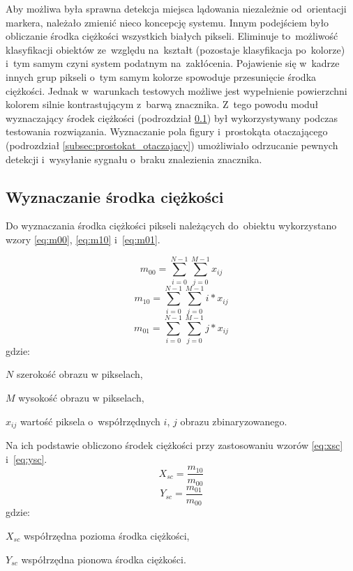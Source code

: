 Aby możliwa była sprawna detekcja miejsca lądowania niezależnie od~orientacji markera, należało zmienić nieco koncepcję systemu. 
Innym podejściem było obliczanie środka ciężkości wszystkich białych pikseli. 
Eliminuje to~możliwość klasyfikacji obiektów ze~względu na~kształt (pozostaje klasyfikacja po~kolorze) i~tym samym czyni system podatnym na~zakłócenia. 
Pojawienie się w~kadrze innych grup pikseli o~tym samym kolorze spowoduje przesunięcie środka ciężkości.
Jednak w~warunkach testowych możliwe jest wypełnienie powierzchni kolorem silnie kontrastującym z~barwą znacznika. 
Z~tego powodu moduł wyznaczający środek ciężkości (podrozdział \ref{subsec:srodek_ciezosci}) był wykorzystywany podczas testowania rozwiązania.
Wyznaczanie pola figury i~prostokąta otaczającego (podrozdział \ref{subsec:prostokat_otaczajacy}) umożliwiało odrzucanie pewnych detekcji i~wysyłanie sygnału o~braku znalezienia znacznika. 

\subsection{Wyznaczanie środka ciężkości}
\label{subsec:srodek_ciezosci}

Do wyznaczania środka ciężkości pikseli należących do~obiektu wykorzystano wzory \eqref{eq:m00}, \eqref{eq:m10} i~\eqref{eq:m01}.

\begin{equation}
\label{eq:m00}
m_{00}=\sum_{i=0}^{N-1}\sum_{j=0}^{M-1} x_{ij}
\end{equation}
\begin{equation}
\label{eq:m10}
m_{10}=\sum_{i=0}^{N-1}\sum_{j=0}^{M-1} i*x_{ij}
\end{equation}
\begin{equation}
\label{eq:m01}
m_{01}=\sum_{i=0}^{N-1}\sum_{j=0}^{M-1} j*x_{ij}
\end{equation}
gdzie:
\begin{eqwhere}[2cm]
	\item[$N$] szerokość obrazu w pikselach,
	\item[$M$] wysokość obrazu w pikselach,
	\item[$x_{ij}$] wartość piksela o~współrzędnych $i$, $j$ obrazu zbinaryzowanego.
\end{eqwhere}
Na ich podstawie obliczono środek ciężkości przy zastosowaniu wzorów \eqref{eq:xsc} i~\eqref{eq:ysc}.
\begin{equation}
\label{eq:xsc}
X_{sc}=\frac{m_{10}}{m_{00}}
\end{equation}
\begin{equation}
\label{eq:ysc}
Y_{sc}=\frac{m_{01}}{m_{00}}
\end{equation}
gdzie:
\begin{eqwhere}[2cm]
	\item[$X_{sc}$] współrzędna pozioma środka ciężkości,
	\item[$Y_{sc}$] współrzędna pionowa środka ciężkości.
\end{eqwhere}

